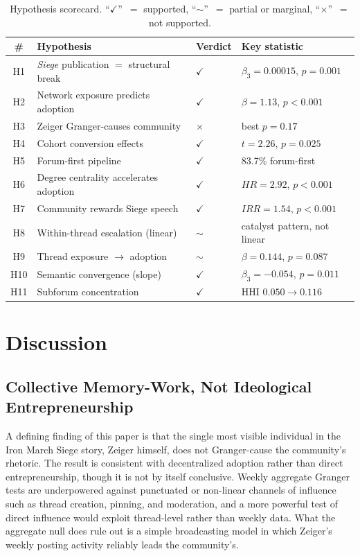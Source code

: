 \documentclass[bibtex,autowc,nonblind]{apsr_submission}
\begin{document}
\begin{table}[t]
    \centering
    \caption{Hypothesis scorecard. ``$\checkmark$''~$=$ supported, ``$\sim$''~$=$ partial or marginal, ``$\times$''~$=$ not supported.}
    \label{tab:scorecard}
    \tiny
    \begin{tabular}{clll}
    \toprule
    \# & Hypothesis & Verdict & Key statistic \\
    \midrule
    H1 & \textit{Siege} publication $=$ structural break & $\checkmark$ & $\beta_3=0.00015$, $p=0.001$ \\
    H2 & Network exposure predicts adoption & $\checkmark$ & $\beta=1.13$, $p<0.001$ \\
    H3 & Zeiger Granger-causes community & $\times$ & best $p=0.17$ \\
    H4 & Cohort conversion effects & $\checkmark$ & $t=2.26$, $p=0.025$ \\
    H5 & Forum-first pipeline & $\checkmark$ & 83.7\% forum-first \\
    H6 & Degree centrality accelerates adoption & $\checkmark$ & $HR=2.92$, $p<0.001$ \\
    H7 & Community rewards Siege speech & $\checkmark$ & $IRR=1.54$, $p<0.001$ \\
    H8 & Within-thread escalation (linear) & $\sim$ & catalyst pattern, not linear \\
    H9 & Thread exposure $\to$ adoption & $\sim$ & $\beta=0.144$, $p=0.087$ \\
    H10 & Semantic convergence (slope) & $\checkmark$ & $\beta_3=-0.054$, $p=0.011$ \\
    H11 & Subforum concentration & $\checkmark$ & HHI $0.050 \to 0.116$ \\
    \bottomrule
    \end{tabular}
\end{table}

\section{Discussion}

\subsection{Collective Memory-Work, Not Ideological Entrepreneurship}

A defining finding of this paper is that the single most visible individual in the Iron March Siege story, Zeiger himself, does not Granger-cause the community's rhetoric. The result is consistent with decentralized adoption rather than direct entrepreneurship, though it is not by itself conclusive. Weekly aggregate Granger tests are underpowered against punctuated or non-linear channels of influence such as thread creation, pinning, and moderation, and a more powerful test of direct influence would exploit thread-level rather than weekly data. What the aggregate null does rule out is a simple broadcasting model in which Zeiger's weekly posting activity reliably leads the community's.
\end{document}
